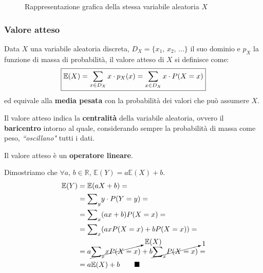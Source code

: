 \begin{figure}[h]
{{
    }
}
    \caption{Rappresentazione grafica della stessa variabile aleatoria $X$}
    \label{fig:mas_prob_rip}
\end{figure}

\subsubsection{Valore atteso}
Data $X$ una variabile aleatoria discreta, $D_X = \{ x_1, \, x_2, \, \dots \}$ il suo dominio e $p_X$ la funzione di massa di probabilità, il valore atteso di $X$ si definisce come: \[
\boxed{
\mathbb E(X) = \sum_{\smash{x \in D_X}} x \cdot p_X(x) = \sum_{x \in D_X} x \cdot P(X = x)}
\] 
ed equivale alla \textbf{media pesata} con la probabilità dei valori che può assumere $X$.
\begin{framed} 
\noindent Il valore atteso indica la \textbf{centralità} della variabile aleatoria, ovvero il \textbf{baricentro} intorno al quale, considerando sempre la probabilità di massa come peso, \textit{``oscillano"} tutti i dati.
\end{framed}
\noindent Il valore atteso è un \textbf{operatore lineare}.

\begin{dimostrazione}
Dimostriamo che $\forall a, \, b \in \mathbb R$, $\mathbb E (Y) = a \mathbb E (X) + b$. \begin{align*}
    \mathbb E (Y) &= \mathbb E (aX + b) = \\
    &= {\sum}_y y \cdot P (Y = y) = \\
    &= {\sum}_x (a x + b) P(X = x) = \\
    &= {\sum}_x (a x P(X = x) + b P(X = x)) = \\
    &= a \cancelto{\mathbb{E}(X)}{{\sum}_x x P(X = x)} + b \cancelto{1}{{\sum}_{x} P(X = x)} = \\
    &= a \mathbb E (X) + b
    \tag*{$\blacksquare$}
\end{align*}
\end{dimostrazione}

